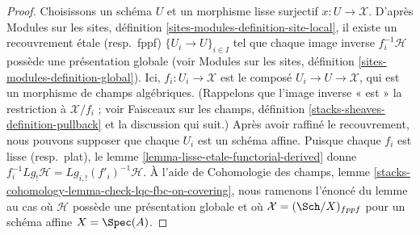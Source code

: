 \begin{proof}
Choisissons un schéma $U$ et un morphisme lisse surjectif
$x : U \to \mathcal{X}$. D'après Modules sur les sites, définition
\ref{sites-modules-definition-site-local}, il existe un recouvrement étale
(resp.\ fppf) $\{U_i \to U\}_{i \in I}$ tel que chaque image inverse
$f_i^{-1}\mathcal{H}$ possède une présentation globale (voir Modules sur les
sites, définition \ref{sites-modules-definition-global}). Ici,
$f_i : U_i \to \mathcal{X}$ est le composé $U_i \to U \to \mathcal{X}$, qui est
un morphisme de champs algébriques. (Rappelons que l'image inverse « est » la
restriction à $\mathcal{X}/f_i$ ; voir Faisceaux sur les champs, définition
\ref{stacks-sheaves-definition-pullback} et la discussion qui suit.) Après
avoir raffiné le recouvrement, nous pouvons supposer que chaque $U_i$ est un
schéma affine. Puisque chaque $f_i$ est lisse (resp.\ plat), le lemme
\ref{lemma-lisse-etale-functorial-derived} donne
$f_i^{-1}Lg_!\mathcal{H} = Lg_{i, !}(f'_i)^{-1}\mathcal{H}$. À l'aide de
Cohomologie des champs, lemme
\ref{stacks-cohomology-lemma-check-lqc-fbc-on-covering}, nous ramenons l'énoncé
du lemme au cas où $\mathcal{H}$ possède une présentation globale et où
$\mathcal{X} = (\Sch/X)_{fppf}$ pour un schéma affine $X = \Spec(A)$.


\end{proof}
